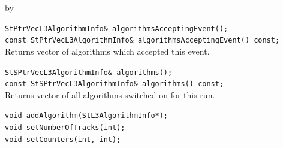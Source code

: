 \documentclass[twoside]{article}
\newcommand{\entrylabel}[1]{\mbox{\textbf{{#1}}}\hfil}%
\newenvironment{entry}
{\begin{list}{}%
    {\renewcommand{\makelabel}{\entrylabel}%
     \setlength{\labelwidth}{90pt}%
     \setlength{\leftmargin}{\labelwidth}
     \advance\leftmargin by \labelsep%
      }%
    }%
  {\end{list}}
\newcommand{\Entrylabel}[1]%
{\raisebox{0pt}[1ex][0pt]{\makebox[\labelwidth][l]%
    {\parbox[t]{\labelwidth}{\hspace{0pt}\textbf{{#1}}}}}}
\newenvironment{Entry}%
{\renewcommand{\entrylabel}{\Entrylabel}\begin{entry}}%
  {\end{entry}}
\begin{document}
\begin{Entry}
    \verb+StPtrVecL3AlgorithmInfo& algorithmsAcceptingEvent();+\\
    \verb+const StPtrVecL3AlgorithmInfo& algorithmsAcceptingEvent() const;+\\
        Returns vector of algorithms which accepted this event.

    \verb+StSPtrVecL3AlgorithmInfo& algorithms();+\\
    \verb+const StSPtrVecL3AlgorithmInfo& algorithms() const;+\\
        Returns vector of all algorithms switched on for this run.

    \verb+void addAlgorithm(StL3AlgorithmInfo*);+\\
    \verb+void setNumberOfTracks(int);+\\
    \verb+void setCounters(int, int);+\\

\end{Entry}
\clearpage
\end{document}
